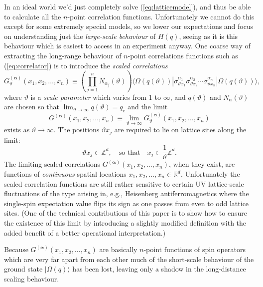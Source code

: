 \documentclass[11pt]{amsart}
\theoremstyle{plain}%
\theoremstyle{definition}
\theoremstyle{remark}
\begin{document}
In an ideal world we'd just completely solve (\ref{eq:latticemodel}), and thus be able to calculate all the $n$-point correlation functions. Unfortunately we cannot do this except for some extremely special models, so we lower our expectations and focus on understanding just the \emph{large-scale behaviour} of $H(q)$, seeing as it is this behaviour which is easiest to access in an experiment anyway. One coarse way of extracting the long-range behaviour of $n$-point correlations functions such as (\ref{eq:correlator}) is to introduce the \emph{scaled correlations}
\begin{equation}
	G^{(\boldsymbol{\alpha})}_\vartheta(x_1, x_2, \ldots, x_n) \equiv  \left(\prod_{j=1}^n N_{\alpha_j}(\vartheta)\right) \langle\Omega(q(\vartheta))|\sigma^{\alpha_1}_{\vartheta x_1}\sigma^{\alpha_2}_{\vartheta x_2} \cdots \sigma^{\alpha_n}_{\vartheta x_n}|\Omega(q(\vartheta))\rangle,
\end{equation}
where $\vartheta$ is a \emph{scale parameter} which varies from $1$ to $\infty$, and $q(\vartheta)$ and $N_{\alpha}(\vartheta)$ are chosen so that $\lim_{\vartheta\rightarrow \infty} q(\vartheta) = q_c$ and the limit  
\begin{equation}
G^{(\boldsymbol{\alpha})}(x_1, x_2, \ldots, x_n) \equiv \lim_{\vartheta\rightarrow \infty}G^{(\boldsymbol{\alpha})}_\vartheta(x_1, x_2, \ldots, x_n)
\end{equation}
exists as $\vartheta\rightarrow\infty$. The positions $\vartheta x_j$ are required to lie on lattice sites along the limit: 
\begin{equation}
	\vartheta x_j \in \mathbb{Z}^d, \quad \text{so that} \quad x_j \in \frac{1}{\vartheta} \mathbb{Z}^d.
\end{equation}
The limiting scaled correlations $G^{(\boldsymbol{\alpha})}(x_1, x_2, \ldots, x_n)$, when they exist, are functions of \emph{continuous} spatial locations $x_1, x_2, \ldots, x_n\in \mathbb{R}^d$. Unfortunately the scaled correlation functions are still rather sensitive to certain UV lattice-scale fluctuations of the type arising in, e.g., Heisenberg antiferromagnetics where the single-spin expectation value flips its sign as one passes from even to odd lattice sites. (One of the technical contributions of this paper is to show how to ensure the existence of this limit by introducing a slightly modified definition with the added benefit of a better operational interpretation.) 

Because $G^{(\boldsymbol{\alpha})}(x_1, x_2, \ldots, x_n)$ are basically $n$-point functions of spin operators which are very far apart from each other much of the short-scale behaviour of the ground state $|\Omega(q)\rangle$ has been lost, leaving only a shadow in the long-distance scaling behaviour.
\end{document}
